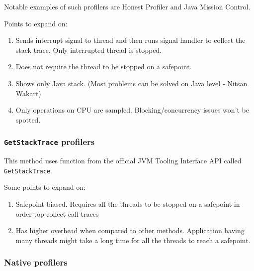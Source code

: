 \documentclass[..thesis.tex]{subfiles}
\begin{document}
Notable examples of such profilers are Honest Profiler and Java Mission Control. 


Points to expand on:
\begin{enumerate}
	\item Sends interrupt signal to thread and then runs signal handler to collect the stack trace. Only interrupted thread is stopped.
	\item Does not require the thread to be stopped on a safepoint.
	\item Shows only Java stack. (Most problems can be solved on Java level - Nitsan Wakart)
	\item Only operations on CPU are sampled. Blocking/concurrency issues won't be spotted.
\end{enumerate}



\subsubsection{\texttt{GetStackTrace} profilers}
This method uses function from the official JVM Tooling Interface API \cite{jvmti_doc} called \texttt{GetStackTrace}.

Some points to expand on:
\begin{enumerate}
	\item Safepoint biased. Requires all the threads to be stopped on a safepoint in order top collect call traces
	\item Has higher overhead when compared to other methods. Application having many threads might take a long time for all the threads to reach a safepoint.
\end{enumerate}

\subsubsection{Native profilers}
\end{document}
